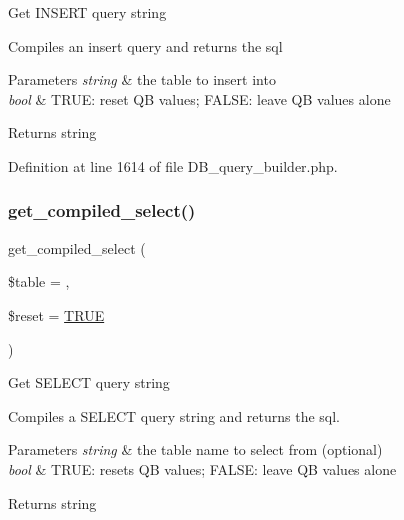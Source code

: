 Get I\+N\+S\+E\+RT query string

Compiles an insert query and returns the sql


\begin{DoxyParams}{Parameters}
{\em string} & the table to insert into \\
\hline
{\em bool} & T\+R\+UE\+: reset QB values; F\+A\+L\+SE\+: leave QB values alone \\
\hline
\end{DoxyParams}
\begin{DoxyReturn}{Returns}
string 
\end{DoxyReturn}


Definition at line 1614 of file D\+B\+\_\+query\+\_\+builder.\+php.

\mbox{\label{class_c_i___d_b__query__builder_a23325dd8908b76e716e430b4968e3987}} 
\subsubsection{\texorpdfstring{get\_compiled\_select()}{get\_compiled\_select()}}
{\footnotesize\ttfamily get\+\_\+compiled\+\_\+select (\begin{DoxyParamCaption}\item[{}]{\$table = {\ttfamily \textquotesingle{}\textquotesingle{}},  }\item[{}]{\$reset = {\ttfamily \mbox{\hyperlink{constants_8php_ae04a3efe6aa42044f803ee90c2277846}{T\+R\+UE}}} }\end{DoxyParamCaption})}

Get S\+E\+L\+E\+CT query string

Compiles a S\+E\+L\+E\+CT query string and returns the sql.


\begin{DoxyParams}{Parameters}
{\em string} & the table name to select from (optional) \\
\hline
{\em bool} & T\+R\+UE\+: resets QB values; F\+A\+L\+SE\+: leave QB values alone \\
\hline
\end{DoxyParams}
\begin{DoxyReturn}{Returns}
string 
\end{DoxyReturn}



